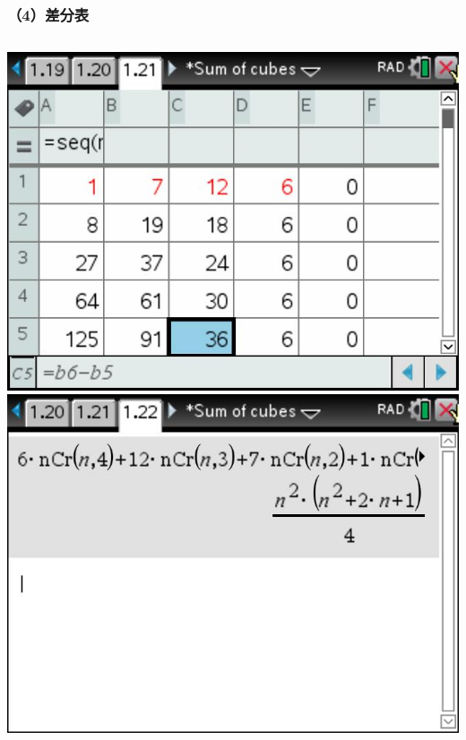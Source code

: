 \documentclass[aspectratio=169]{beamer}
\begin{document}
       
       \begin{frame}
      \frametitle{（4）差分表}
      \begin{columns}
      	\includegraphics[scale=0.3]{差分表.jpg}
      	\vspace{2cm}
      	\includegraphics[scale=0.3]{差分算法.jpg}
      	\vspace{2cm}
      \end{columns}      
  \end{frame}
\end{document}
